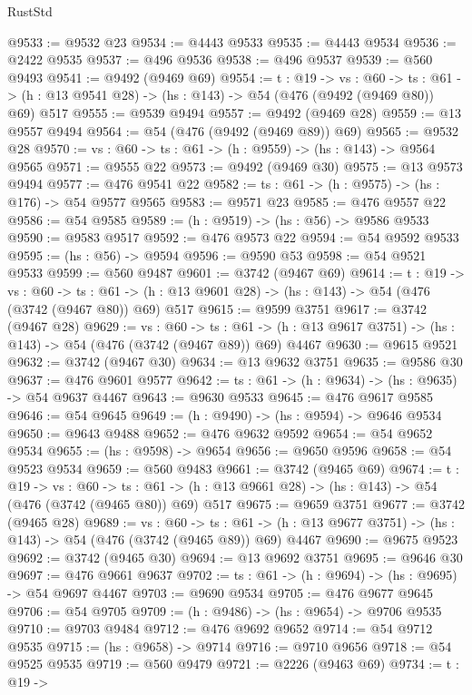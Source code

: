 \begin{lexlean}{RustStd}
\begin{coremodule}
@9533 := @9532 @23
@9534 := @4443 @9533
@9535 := @4443 @9534
@9536 := @2422 @9535
@9537 := @496 @9536
@9538 := @496 @9537
@9539 := @560 @9493
@9541 := @9492 (@9469 @69)
@9554 := {t : @19} ->
  {vs : @60} ->
  {ts : @61} -> (h : @13 @9541 @28) -> (hs : @143) -> @54 (@476 (@9492 (@9469 @80)) @69) @517
@9555 := @9539 @9494
@9557 := @9492 (@9469 @28)
@9559 := @13 @9557 @9494
@9564 := @54 (@476 (@9492 (@9469 @89)) @69)
@9565 := @9532 @28
@9570 := {vs : @60} -> {ts : @61} -> (h : @9559) -> (hs : @143) -> @9564 @9565
@9571 := @9555 @22
@9573 := @9492 (@9469 @30)
@9575 := @13 @9573 @9494
@9577 := @476 @9541 @22
@9582 := {ts : @61} -> (h : @9575) -> (hs : @176) -> @54 @9577 @9565
@9583 := @9571 @23
@9585 := @476 @9557 @22
@9586 := @54 @9585
@9589 := (h : @9519) -> (hs : @56) -> @9586 @9533
@9590 := @9583 @9517
@9592 := @476 @9573 @22
@9594 := @54 @9592 @9533
@9595 := (hs : @56) -> @9594
@9596 := @9590 @53
@9598 := @54 @9521 @9533
@9599 := @560 @9487
@9601 := @3742 (@9467 @69)
@9614 := {t : @19} ->
  {vs : @60} ->
  {ts : @61} -> (h : @13 @9601 @28) -> (hs : @143) -> @54 (@476 (@3742 (@9467 @80)) @69) @517
@9615 := @9599 @3751
@9617 := @3742 (@9467 @28)
@9629 := {vs : @60} ->
  {ts : @61} -> (h : @13 @9617 @3751) -> (hs : @143) -> @54 (@476 (@3742 (@9467 @89)) @69) @4467
@9630 := @9615 @9521
@9632 := @3742 (@9467 @30)
@9634 := @13 @9632 @3751
@9635 := @9586 @30
@9637 := @476 @9601 @9577
@9642 := {ts : @61} -> (h : @9634) -> (hs : @9635) -> @54 @9637 @4467
@9643 := @9630 @9533
@9645 := @476 @9617 @9585
@9646 := @54 @9645
@9649 := (h : @9490) -> (hs : @9594) -> @9646 @9534
@9650 := @9643 @9488
@9652 := @476 @9632 @9592
@9654 := @54 @9652 @9534
@9655 := (hs : @9598) -> @9654
@9656 := @9650 @9596
@9658 := @54 @9523 @9534
@9659 := @560 @9483
@9661 := @3742 (@9465 @69)
@9674 := {t : @19} ->
  {vs : @60} ->
  {ts : @61} -> (h : @13 @9661 @28) -> (hs : @143) -> @54 (@476 (@3742 (@9465 @80)) @69) @517
@9675 := @9659 @3751
@9677 := @3742 (@9465 @28)
@9689 := {vs : @60} ->
  {ts : @61} -> (h : @13 @9677 @3751) -> (hs : @143) -> @54 (@476 (@3742 (@9465 @89)) @69) @4467
@9690 := @9675 @9523
@9692 := @3742 (@9465 @30)
@9694 := @13 @9692 @3751
@9695 := @9646 @30
@9697 := @476 @9661 @9637
@9702 := {ts : @61} -> (h : @9694) -> (hs : @9695) -> @54 @9697 @4467
@9703 := @9690 @9534
@9705 := @476 @9677 @9645
@9706 := @54 @9705
@9709 := (h : @9486) -> (hs : @9654) -> @9706 @9535
@9710 := @9703 @9484
@9712 := @476 @9692 @9652
@9714 := @54 @9712 @9535
@9715 := (hs : @9658) -> @9714
@9716 := @9710 @9656
@9718 := @54 @9525 @9535
@9719 := @560 @9479
@9721 := @2226 (@9463 @69)
@9734 := {t : @19} ->

\end{coremodule}
\end{lexlean}
